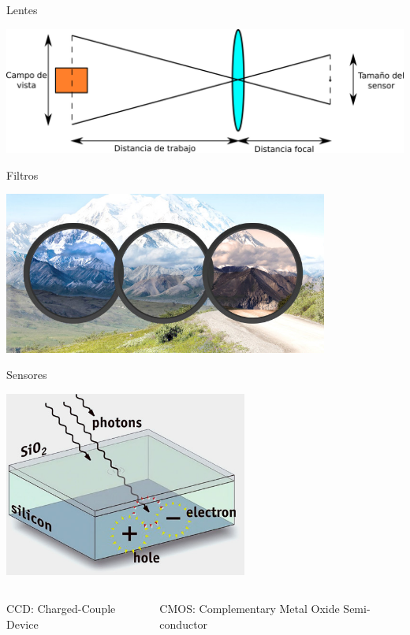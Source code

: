 \documentclass{if-beamer}
\begin{document}
\begin{frame}{Lentes}
    \begin{center}
        \includegraphics[width=\textwidth]{Lens.png}
    \end{center}
\end{frame}

\begin{frame}{Filtros}
    \begin{center}
        \includegraphics[width=0.8\textwidth]{filters.png}
    \end{center}
\end{frame}

\begin{frame}{Sensores}
\begin{center}
    \includegraphics[width= 0.6\textwidth]{photons-hit-silicon.jpg}
\end{center}

    \begin{columns}
    \begin{column}{0.5\textwidth}
        CCD: Charged-Couple Device
    \end{column}
    \begin{column}{0.5\textwidth}
        CMOS: Complementary Metal Oxide Semi-conductor
    \end{column}
    \end{columns}
\end{frame}
\end{document}
